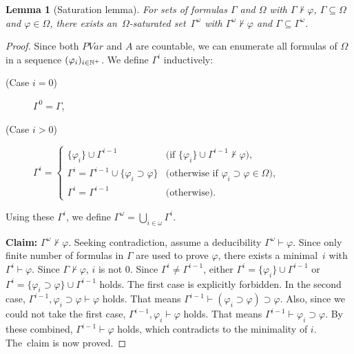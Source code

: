 \documentclass[doctor]{iscs-thesis}
\newtheorem{lemma}{Lemma}
\begin{document}
\begin{lemma}[Saturation lemma]
\label{saturation}
 For sets of formulas $\Gamma$ and $\Omega$ with $\Gamma\not\vdash\varphi$, 
 $\Gamma\subseteq \Omega$ and $\varphi \in \Omega$,
there exists an~$\Omega$-saturated
 set~$\Gamma^\omega$ with $\Gamma^\omega\not\vdash\varphi$
 and $\Gamma\subseteq \Gamma^\omega$.
\end{lemma}
\begin{proof}
 Since both $PVar$ and $A$ are countable, we can enumerate all formulas
 of $\Omega$ in a sequence
 $(\varphi_i)_{i\in{\mathbb N}^{+}}$.
 We define $\Gamma^i$ inductively:
\begin{description}
 \item[(Case $i = 0$)] $\Gamma^0 = \Gamma$,
 \item[(Case $i > 0$)] $\Gamma^i =
\begin{cases}
\{\varphi_{i}\}\cup \Gamma^{i-1} & \text{(if
 $\{\varphi_{i}\}\cup\Gamma^{i-1}\not\vdash\varphi$)}, \\
\Gamma^i = \Gamma^{i-1} \cup\{\varphi_{i}\supset\varphi\} &\text{(otherwise if
 $\varphi_i\supset \varphi\in \Omega)$},\\
 \Gamma^i = \Gamma^{i-1} &\text{(otherwise)}.
\end{cases}$
\end{description}
Using these $\Gamma^i$\kern -1pt, we define $\Gamma^\omega = \bigcup_{i\in\omega}
 \Gamma^i$\kern -1pt.

\noindent
\textbf{Claim:} 
 $\Gamma^\omega \not\vdash \varphi$.
Seeking contradiction, assume a deducibility $\Gamma^\omega\vdash\varphi$. 
Since only finite number of formulas in $\Gamma$ are used to prove $\varphi$,
there exists 
 a minimal~$i$ with
 $\Gamma^i\vdash\varphi$. Since $\Gamma\not\vdash\varphi$, $i$ is not 0.
 Since $\Gamma^i\neq \Gamma^{i-1}$, 
 either $\Gamma^i = \{\varphi_{i}\} \cup \Gamma^{i-1}$ 
or $\Gamma^i = \{\varphi_{i}\supset\varphi\}\cup \Gamma^{i-1}$ holds.
 The first case is explicitly forbidden.
 In the second case, $\Gamma^{i-1},\varphi_{i}\supset\varphi\vdash \varphi$ holds.
 That means $\Gamma^{i-1}\vdash (\varphi_{i}\supset\varphi)\supset \varphi$.
 Also, since we could not take the first case, $\Gamma^{i-1},\varphi_{i}\vdash \varphi$
 holds. That means $\Gamma^{i-1}\vdash \varphi_{i}\supset\varphi$.
 By these combined, $\Gamma^{i-1}\vdash\varphi$ holds, which contradicts to the minimality of
 $i$. The~claim is now proved.
\end{proof}
\end{document}
